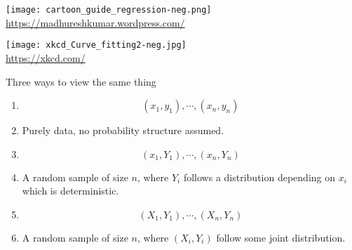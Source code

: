 \begin{frame}
	\begin{center}
\texttt{[image: cartoon\_guide\_regression-neg.png]}
\vspace{2em}
\footnotesize
\url{https://madhureshkumar.wordpress.com/}
	\end{center}
\end{frame}
\begin{frame}
	\centering
	\texttt{[image: xkcd\_Curve\_fitting2-neg.jpg]}
	\\
	\footnotesize \url{https://xkcd.com/}
\end{frame}
\begin{frame}[fragile]{Three ways to view the same thing}

	\begin{enumerate}
		\item[]
			\[(x_1,y_1),\cdots, (x_n,y_n)\]
		\item Purely data, no probability structure assumed.
			\vfill
		\item[]
			\[(x_1,Y_1),\cdots,(x_n,Y_n)\]
		\item A random sample of size $n$, where $Y_i$ follows a distribution depending on $x_i$ which is 
			deterministic.
			\vfill
		\item[]
			\[
			(X_1,Y_1),\cdots,(X_n,Y_n)
			\]
		\item A random sample of size $n$, where $(X_i,Y_i)$ follow some joint distribution.
	\end{enumerate}
\end{frame}
